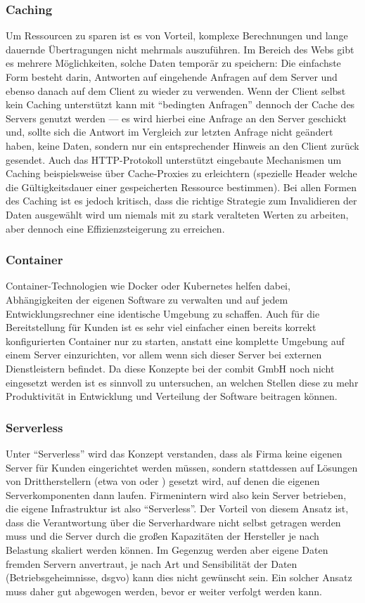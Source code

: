 \subsubsection{Caching}
Um Ressourcen zu sparen ist es von Vorteil, komplexe Berechnungen und lange dauernde Übertragungen nicht mehrmals auszuführen. Im Bereich des Webs gibt es mehrere Möglichkeiten, solche Daten temporär zu speichern: Die einfachste Form besteht darin, Antworten auf eingehende Anfragen auf dem Server und ebenso danach auf dem Client zu wieder zu verwenden. Wenn der Client selbst kein Caching unterstützt kann mit ``bedingten Anfragen'' dennoch der Cache des Servers genutzt werden --- es wird hierbei eine Anfrage an den Server geschickt und, sollte sich die Antwort im Vergleich zur letzten Anfrage nicht geändert haben, keine Daten, sondern nur ein entsprechender Hinweis an den Client zurück gesendet. Auch das HTTP-Protokoll unterstützt eingebaute Mechanismen um Caching beispielsweise über Cache-Proxies zu erleichtern (spezielle Header welche die Gültigkeitsdauer einer gespeicherten Ressource bestimmen). Bei allen Formen des Caching ist es jedoch kritisch, dass die richtige Strategie zum Invalidieren der Daten ausgewählt wird um niemals mit zu stark veralteten Werten zu arbeiten, aber dennoch eine Effizienzsteigerung zu erreichen.

\subsubsection{Container}
Container-Technologien wie Docker oder Kubernetes helfen dabei, Abhängigkeiten der eigenen Software zu verwalten und auf jedem Entwicklungsrechner eine identische Umgebung zu schaffen. Auch für die Bereitstellung für Kunden ist es sehr viel einfacher einen bereits korrekt konfigurierten Container nur zu starten, anstatt eine komplette Umgebung auf einem Server einzurichten, vor allem wenn sich dieser Server bei externen Dienstleistern befindet. Da diese Konzepte bei der combit GmbH noch nicht eingesetzt werden ist es sinnvoll zu untersuchen, an welchen Stellen diese zu mehr Produktivität in Entwicklung und Verteilung der Software beitragen können.

\subsubsection{Serverless}
Unter ``Serverless'' wird das Konzept verstanden, dass als Firma keine eigenen Server für Kunden eingerichtet werden müssen, sondern stattdessen auf Lösungen von Drittherstellern (etwa  von  oder ) gesetzt wird, auf denen die eigenen Serverkomponenten dann laufen. Firmenintern wird also kein Server betrieben, die eigene Infrastruktur ist also ``Serverless''. Der Vorteil von diesem Ansatz ist, dass die Verantwortung über die Serverhardware nicht selbst getragen werden muss und die Server durch die großen Kapazitäten der Hersteller je nach Belastung skaliert werden können. Im Gegenzug werden aber eigene Daten fremden Servern anvertraut, je nach Art und Sensibilität der Daten (Betriebsgeheimnisse, \gls{dsgvo}) kann dies nicht gewünscht sein. Ein solcher Ansatz muss daher gut abgewogen werden, bevor er weiter verfolgt werden kann.

